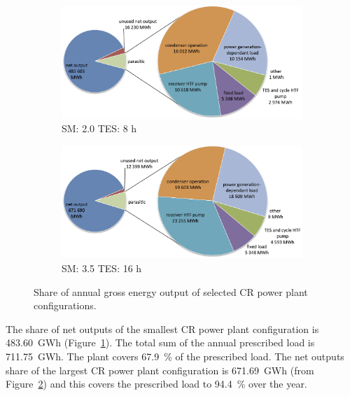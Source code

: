 \begin{figure}[!htbp]
        \centering   
        \begin{subfigure}[b]{0.75\textwidth}
                \centering
                \includegraphics[width=1\textwidth]{FIG/CR_parasitics_low}
                \caption{SM: 2.0 TES: 8 h}\label{CR_parasitics_low}
        \end{subfigure}
        \begin{subfigure}[b]{0.75\textwidth}
                \centering
                \includegraphics[width=1\textwidth]{FIG/CR_parasitics_high}
                \caption{SM: 3.5 TES: 16 h}\label{CR_parasitics_high}
        \end{subfigure}
        \caption[Share of annual gross energy output of selected CR power plant configurations.]{Share of annual gross energy output of selected CR power plant configurations.}\label{CR_parasitics}
\end{figure}

The share of net outputs of the smallest \ac{CR} power plant configuration is \SI{483.60}{GWh} (Figure~\ref{CR_parasitics_low}). The total sum of the annual prescribed load is \SI{711.75}{GWh}. The plant covers \SI{67.9}{\percent} of the prescribed load. The net outputs share of the largest \ac{CR} power plant configuration is \SI{671.69}{GWh} (from Figure~\ref{CR_parasitics_high}) and this covers the prescribed load to \SI{94.4}{\percent} over the year.

